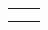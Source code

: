 
\hspace*{0.55\textwidth}%
\begin{tabularx}{0.5\textwidth}{@{}LR@{}}
\textbf{} & \textbf{} \\
\textbf{} & \textbf{} \\
\end{tabularx}

{\renewcommand\labelitemi{}
\begin{itemize}
\end{itemize}
}